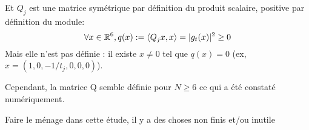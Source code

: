 Et \(Q_j\) est une matrice symétrique par définition du produit scalaire, positive par définition du module:
\[
\forall x \in \mathbb R^6, q(x) := \left<Q_jx,x\right> = |g_t(x)|^2 \ge 0
\]
Mais elle n'est pas définie : il existe \(x \not = 0\) tel que \(q(x) = 0\) (ex, \(x = (1,0,-1/t_j,0,0,0)\)).

Cependant, la matrice Q semble définie pour \(N \ge 6\) ce qui a été constaté numériquement.

\begin{TODO}
  Faire le ménage dans cette étude, il y a des choses non finis et/ou inutile
\end{TODO}






